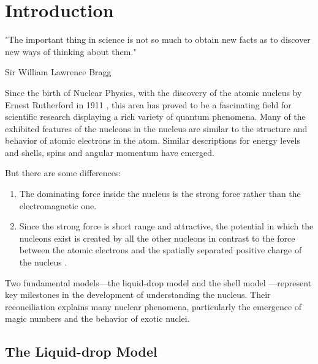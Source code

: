 
%

\chapter{Introduction}
\label{cha:introduction}

\epigraph{
  "The important thing in science is not so much to obtain new facts as to discover new ways of thinking about them."
}{Sir William Lawrence Bragg}


Since the birth of Nuclear Physics, with the discovery of the atomic nucleus by Ernest Rutherford in 1911 \cite{rutherford_lxxix_1911}, this area has proved to be a fascinating field for scientific research displaying a rich variety of quantum phenomena.
Many of the exhibited features of the nucleons in the nucleus are similar to the structure and behavior of atomic electrons in the atom. Similar descriptions for energy levels and shells, spins and angular momentum have emerged.

But there are some differences:
\begin{enumerate}
	\item The dominating force inside the nucleus is the strong force rather than the electromagnetic one.
	\item Since the strong force is short range and attractive, the potential in which the nucleons exist is created by all the other nucleons in contrast to the force between the atomic electrons and the spatially separated positive charge of the nucleus \cite{Taylor2011}.
\end{enumerate}

Two fundamental models—the liquid-drop model \cite{bethe_nuclear_1936} and the shell model \cite{mayer_1948}—represent key milestones in the development of understanding the nucleus. Their reconciliation explains many nuclear phenomena, particularly the emergence of magic numbers and the behavior of exotic nuclei.

\section{The Liquid-drop Model}

